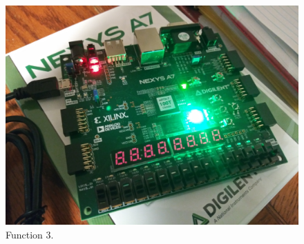 \documentclass{article}
\begin{document}
\begin{figure}[H]
    \centering
    \includegraphics[width=\textwidth]{Images/3}
    \caption{Function 3.}
    \label{pic:func3}
\end{figure}
\end{document}
